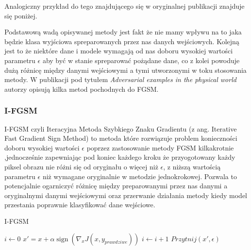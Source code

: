 \documentclass{article}
\begin{document}
    Analogiczny przykład do tego znajdującego się w oryginalnej publikacji\cite{harnessing} znajduje się poniżej.

    Podstawową wadą opisywanej metody jest fakt że nie mamy wpływu na to jaka będzie klasa wyjściowa
    spreparowanych przez nas danych wejściowych. Kolejną jest to że niektóre dane i modele wymagają od nas
    doboru wysokiej wartości parametru $\epsilon$ aby być w stanie spreparować pożądane dane, co z kolei powoduje dużą
    różnicę między danymi wejściowymi a tymi utworzonymi w toku stosowania metody.
    W publikacji pod tytułem \textit{Adversarial examples in the physical world}\cite{DBLP:journals/corr/KurakinGB16}
    autorzy opisują kilka metod pochodnych do FGSM.

    \subsubsection{I-FGSM}
    I-FGSM czyli Iteracyjna Metoda Szybkiego Znaku Gradientu (z ang. Iterative Fast Gradient Sign Method) to metoda
    które rozwiązuje problem konieczności doboru wysokiej wartości $\epsilon$ poprzez zastosowanie metody FGSM kilkakrotnie
    ,jednocześnie zapewniając pod koniec każdego kroku że przyogotowany każdy piksel obrazu nie różni się od oryginału o więcej
    niż $\epsilon$, z niższą wartością parametru $\epsilon$ niż wymagane oryginalnie w metodzie jednokrokowej.
    Pozwala to  potencjalnie ogarniczyć różnicę między preparowanymi przez nas danymi a oryginalnymi danymi wejściowymi
    oraz przerwanie działania metody kiedy model przestania poprawnie klasyfikować dane wejściowe.

    \begin{algorithm}
    \caption{I-FGSM}\label{IFGSM}
    \begin{algorithmic}[1]
    \State $i \gets 0$
        \State $x' = x + \alpha\operatorname{sign}(\nabla_{x} J(x, y_{prawdziwe}))$
        \State $i \gets i+1$
        \State $Przytnij(x', \epsilon)$
    \EndWhile
    \end{algorithmic}
    \end{algorithm}
\end{document}
